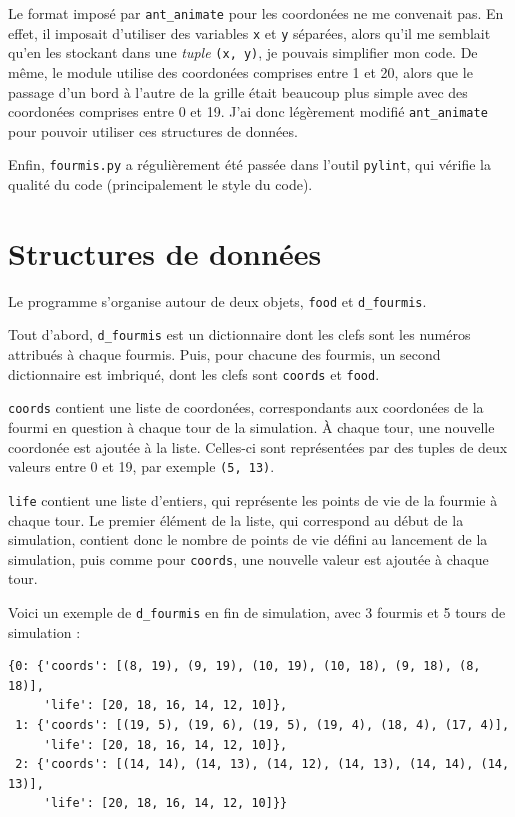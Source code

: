 \documentclass[a4paper,12pt]{article}
\begin{document}
Le format imposé par \verb|ant_animate| pour les coordonées ne me convenait pas. En effet, il imposait d'utiliser des variables \verb|x| et \verb|y| séparées, alors qu'il me semblait qu'en les stockant dans une \emph{tuple} \verb|(x, y)|, je pouvais simplifier mon code. De même, le module utilise des coordonées comprises entre 1 et 20, alors que le passage d'un bord à l'autre de la grille était beaucoup plus simple avec des coordonées comprises entre 0 et 19. J'ai donc légèrement modifié \verb|ant_animate| pour pouvoir utiliser ces structures de données.

Enfin, \verb|fourmis.py| a régulièrement été passée dans l'outil \verb|pylint|, qui vérifie la qualité du code (principalement le style du code).

\section{Structures de données}

Le programme s'organise autour de deux objets, \verb|food| et \verb|d_fourmis|.

Tout d'abord, \verb|d_fourmis| est un dictionnaire dont les clefs sont les numéros attribués à chaque fourmis. Puis, pour chacune des fourmis, un second dictionnaire est imbriqué, dont les clefs sont \verb|coords| et \verb|food|.

\verb|coords| contient une liste de coordonées, correspondants aux coordonées de la fourmi en question à chaque tour de la simulation. À chaque tour, une nouvelle coordonée est ajoutée à la liste. Celles-ci sont représentées par des tuples de deux valeurs entre 0 et 19, par exemple \verb|(5, 13)|.

\verb|life| contient une liste d'entiers, qui représente les points de vie de la fourmie à chaque tour. Le premier élément de la liste, qui correspond au début de la simulation, contient donc le nombre de points de vie défini au lancement de la simulation, puis comme pour \verb|coords|, une nouvelle valeur est ajoutée à chaque tour.

Voici un exemple de \verb|d_fourmis| en fin de simulation, avec 3 fourmis et 5 tours de simulation :

\begin{verbatim}
{0: {'coords': [(8, 19), (9, 19), (10, 19), (10, 18), (9, 18), (8, 18)],
     'life': [20, 18, 16, 14, 12, 10]},
 1: {'coords': [(19, 5), (19, 6), (19, 5), (19, 4), (18, 4), (17, 4)],
     'life': [20, 18, 16, 14, 12, 10]},
 2: {'coords': [(14, 14), (14, 13), (14, 12), (14, 13), (14, 14), (14, 13)],
     'life': [20, 18, 16, 14, 12, 10]}}
\end{verbatim}
\end{document}

